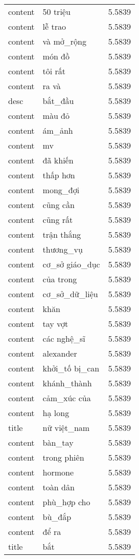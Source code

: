 \documentclass{article}
\begin{document}
\begin{tabular}{lll}
content & 50 triệu & 5.5839\\
content & lễ trao & 5.5839\\
content & và mở\_rộng & 5.5839\\
content & món đồ & 5.5839\\
content & tôi rất & 5.5839\\
content & ra và & 5.5839\\
desc & bắt\_đầu & 5.5839\\
content & màu đỏ & 5.5839\\
content & ám\_ảnh & 5.5839\\
content & mv & 5.5839\\
content & đã khiến & 5.5839\\
content & thấp hơn & 5.5839\\
content & mong\_đợi & 5.5839\\
content & cũng cần & 5.5839\\
content & cũng rất & 5.5839\\
content & trận thắng & 5.5839\\
content & thương\_vụ & 5.5839\\
content & cơ\_sở giáo\_dục & 5.5839\\
content & của trong & 5.5839\\
content & cơ\_sở\_dữ\_liệu & 5.5839\\
content & khăn & 5.5839\\
content & tay vợt & 5.5839\\
content & các nghệ\_sĩ & 5.5839\\
content & alexander & 5.5839\\
content & khởi\_tố bị\_can & 5.5839\\
content & khánh\_thành & 5.5839\\
content & cảm\_xúc của & 5.5839\\
content & hạ long & 5.5839\\
title & nữ việt\_nam & 5.5839\\
content & bàn\_tay & 5.5839\\
content & trong phiên & 5.5839\\
content & hormone & 5.5839\\
content & toàn dân & 5.5839\\
content & phù\_hợp cho & 5.5839\\
content & bù\_đắp & 5.5839\\
content & để ra & 5.5839\\
title & bắt & 5.5839\\

\end{tabular}
\end{document}
